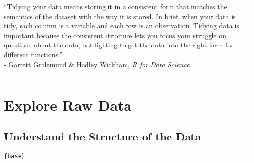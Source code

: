 \documentclass[]{book}
\begin{document}
``Tidying your data means storing it in a consistent form that matches the semantics of the dataset with the way it is stored. In brief, when your data is tidy, each column is a variable and each row is an observation. Tidying data is important because the consistent structure lets you focus your struggle on questions about the data, not fighting to get the data into the right form for different functions.''\\
- Garrett Grolemund \& Hadley Wickham, \emph{R for Data Science}

\begin{center}\rule{0.5\linewidth}{\linethickness}\end{center}

\hypertarget{explore-raw-data}{%
\section{Explore Raw Data}\label{explore-raw-data}}

\hypertarget{understand-the-structure-of-the-data}{%
\subsection{Understand the Structure of the Data}\label{understand-the-structure-of-the-data}}

\texttt{\{base\}}
\end{document}
